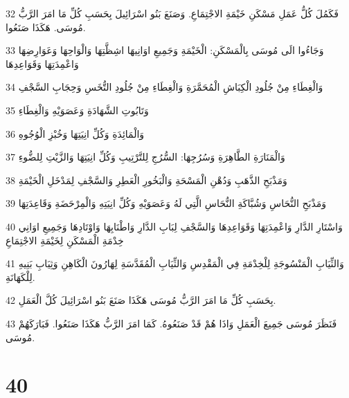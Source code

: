 \par 32 فَكَمُلَ كُلُّ عَمَلِ مَسْكَنِ خَيْمَةِ الاجْتِمَاعِ. وَصَنَعَ بَنُو اسْرَائِيلَ بِحَسَبِ كُلِّ مَا امَرَ الرَّبُّ مُوسَى. هَكَذَا صَنَعُوا.
\par 33 وَجَاءُوا الَى مُوسَى بِالْمَسْكَنِ: الْخَيْمَةِ وَجَمِيعِ اوَانِيهَا اشِظَّتِهَا وَالْوَاحِهَا وَعَوَارِضِهَا وَاعْمِدَتِهَا وَقَوَاعِدِهَا
\par 34 وَالْغِطَاءِ مِنْ جُلُودِ الْكِبَاشِ الْمُحَمَّرَةِ وَالْغِطَاءِ مِنْ جُلُودِ التُّخَسِ وَحِجَابِ السَّجْفِ
\par 35 وَتَابُوتِ الشَّهَادَةِ وَعَصَوَيْهِ وَالْغِطَاءِ
\par 36 وَالْمَائِدَةِ وَكُلِّ انِيَتِهَا وَخُبْزِ الْوُجُوهِ
\par 37 وَالْمَنَارَةِ الطَّاهِرَةِ وَسُرُجِهَا: السُّرُجِ لِلتَّرْتِيبِ وَكُلِّ انِيَتِهَا وَالزَّيْتِ لِلضُّوءِ
\par 38 وَمَذْبَحِ الذَّهَبِ وَدُهْنِ الْمَسْحَةِ وَالْبَخُورِ الْعَطِرِ وَالسَّجْفِ لِمَدْخَلِ الْخَيْمَةِ
\par 39 وَمَذْبَحِ النُّحَاسِ وَشُبَّاكَةِ النُّحَاسِ الَّتِي لَهُ وَعَصَوَيْهِ وَكُلِّ انِيَتِهِ وَالْمِرْحَضَةِ وَقَاعِدَتِهَا
\par 40 وَاسْتَارِ الدَّارِ وَاعْمِدَتِهَا وَقَوَاعِدِهَا وَالسَّجْفِ لِبَابِ الدَّارِ وَاطْنَابِهَا وَاوْتَادِهَا وَجَمِيعِ اوَانِي خِدْمَةِ الْمَسْكَنِ لِخَيْمَةِ الاجْتِمَاعِ
\par 41 وَالثِّيَابِ الْمَنْسُوجَةِ لِلْخِدْمَةِ فِي الْمَقْدِسِ وَالثِّيَابِ الْمُقَدَّسَةِ لِهَارُونَ الْكَاهِنِ وَثِيَابِ بَنِيهِ لِلْكَهَانَةِ.
\par 42 بِحَسَبِ كُلِّ مَا امَرَ الرَّبُّ مُوسَى هَكَذَا صَنَعَ بَنُو اسْرَائِيلَ كُلَّ الْعَمَلِ.
\par 43 فَنَظَرَ مُوسَى جَمِيعَ الْعَمَلِ وَاذَا هُمْ قَدْ صَنَعُوهُ. كَمَا امَرَ الرَّبُّ هَكَذَا صَنَعُوا. فَبَارَكَهُمْ مُوسَى.

\chapter{40}

